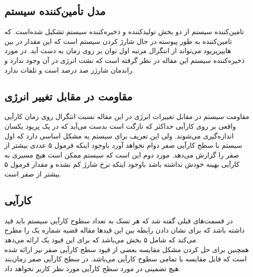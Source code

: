 \documentclass[a4paper, 11pt]{article}
\begin{document}
\subsection{مدل تأمین‌کننده سیستم}
تامین‌کننده سیستم از دو بخش تولید‌کننده و ذخیر‌ه‌کننده سیستم تشکیل شده‌است.
که تامین‌کننده به طور پیوسته در حال شارژ کردن سیستم است که این مقدار در بین هایپرپریود می‌تواند
از انتگرال مرتبه اول توان بر روی زمان به دست آید.
در مورد ذخیره‌کننده سیستم این مقاله در نظر گرفته است که نشت انرژی در آن وجود ندارد
و راندمان شارژر صد درصد است و تلفات ندارد.

\subsection{مقاومت در مقابل تغییر انرژی}
مقاومت سیستم در مقابل تغییرات انرژی در این مقاله نسبت انتگرال روی زمان کارآیی واقعی بر روی
کارآیی حداکثر که تارگت است بدست می‌آید که در یک پریود یکسان اندازه‌گیری می‌شوند.
ولی این تعریف برای سیستم یه مشکل اساسی دارد که
اول سیستم با سطح کارآیی صفر دوام نخواهد‌ آورد باوجود اینکه فرمول ۵ عددی بیشتر از صفر را گزارش
می‌دهد. مورد دوم این است که سیستم ممکن است هیچ مسیری به کارآیی بهینه خودش نداشته باشد
باوجود اینکه نرخ شارژ کم نشده و مقدار فرمول ۵ بیشتر از صفر است.

\subsection{کارآیی}
در قسمت‌های قبلی گفته شد که هر تسک به تعداد سطوح کارآیی سیستم باید قید
داشته باشد که برای نشان دادن رابطه بین این قید‌ها مقاله قضیه شماره یک را مطرح می‌کند که شامل ۵
بخش می‌باشد که برای این قیود یک
ارائه می‌دهد. \\
همچنین برای حل کردن مشکل مقایسه بعضی از قیود سطح کارآیی صفر نیز ارائه شده است
که قابل مقایسه با تمامی سطوح کارآیی می‌باشد.
در سطح کارآیی صفر زمان‌بند هیچ تضمینی در مورد سطح کارآیی مورد نظر کاربر نخواهد داد.
\end{document}
